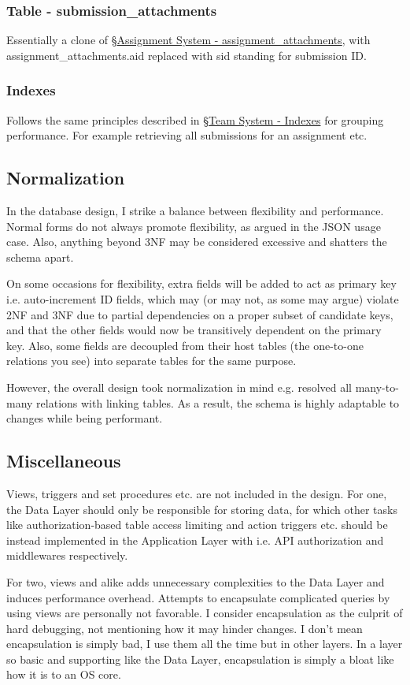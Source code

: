 \documentclass[12pt]{report}
\newcommand{\n}{\par}
\begin{document}
\subsubsection{Table - submission\_attachments} \label{data-layer.design.assignment-system.submission_attachments}
Essentially a clone of \S \hyperref[data-layer.design.assignment-system.assignment_attachments]{Assignment System - assignment\_attachments},
with assignment\_attach\-ments.aid replaced with sid standing for submission ID.

\subsubsection{Indexes} \label{data-layer.design.assignment-system.indexes}
Follows the same principles described in
\S \hyperref[data-layer.design.team-system.indexes]{Team System - Indexes}
for grouping performance.
For example retrieving all submissions for an assignment etc.


\subsection{Normalization} \label{data-layer.design.normalization}
In the database design, I strike a balance between flexibility and performance.
Normal forms do not always promote flexibility, as argued in the JSON usage case.
Also, anything beyond 3NF may be considered excessive and shatters the schema apart.\n
On some occasions for flexibility, extra fields will be added to act as primary key i.e. auto-increment ID fields,
which may (or may not, as some may argue) violate 2NF and 3NF due to partial dependencies on a proper subset of candidate keys,
and that the other fields would now be transitively dependent on the primary key.
Also, some fields are decoupled from their host tables (the one-to-one relations you see) into separate tables for the same purpose.\n
However, the overall design took normalization in mind e.g. resolved all many-to-many relations with linking tables.
As a result, the schema is highly adaptable to changes while being performant.


\subsection{Miscellaneous} \label{data-layer.design.miscellaneous}
Views, triggers and set procedures etc. are not included in the design.
For one, the Data Layer should only be responsible for storing data,
for which other tasks like authorization-based table access limiting and
action triggers etc. should be instead implemented in the Application Layer
with i.e. API authorization and middlewares respectively.\n
For two, views and alike adds unnecessary complexities to the Data Layer and
induces performance overhead.
Attempts to encapsulate complicated queries by using views are personally not favorable.
I consider encapsulation as the culprit of hard debugging, not mentioning how it may hinder changes.
I don't mean encapsulation is simply bad, I use them all the time but in other layers.
In a layer so basic and supporting like the Data Layer, encapsulation is simply a bloat like how it is to an OS core.
\end{document}
